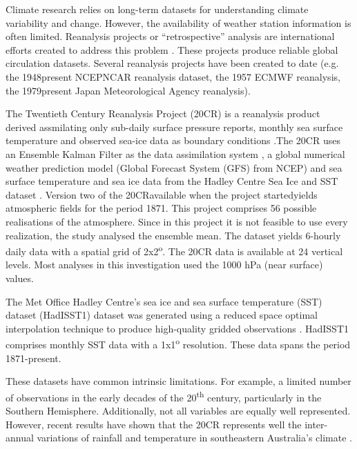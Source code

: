 Climate research relies on long-term datasets for understanding climate
variability and change. However, the availability of weather station 
information is often limited. Reanalysis projects
or \textquotedblleft retrospective\textquotedblright{} analysis are
international efforts created to address this problem \citep*{Compo2011}.
These projects produce reliable global circulation datasets. Several
reanalysis projects have been created to date (e.g. the 1948\textendash present
NCEP\textendash NCAR reanalysis dataset, the 1957
ECMWF reanalysis, the 1979\textendash present Japan Meteorological
Agency reanalysis). 

The Twentieth Century Reanalysis Project (20CR) is a reanalysis product
derived assmilating only sub-daily surface pressure reports,
monthly sea surface temperature and observed sea-ice data as boundary
conditions \citep*{Compo2011}.The 20CR uses an Ensemble Kalman Filter as 
the data assimilation system \citep{Whitaker2011}, a global numerical weather prediction model 
(Global Forecast System (GFS) from NCEP) and sea surface temperature and sea ice data from
the Hadley Centre Sea Ice and SST dataset \citep{Rayner2003}. Version two of the 20CR\textemdash available
when the project started\textemdash yields atmospheric fields for
the period 1871. This project comprises 56 possible
realisations of the atmosphere. Since in this project it is not feasible
to use every realization, the study analysed the ensemble mean. The
dataset yields 6-hourly daily data with a spatial grid of 2x2\textsuperscript{o}.
The 20CR data is available at 24 vertical levels. Most analyses in
this investigation used the 1000 hPa (near surface) values.

The Met Office Hadley Centre\textquoteright s sea ice and sea surface
temperature (SST) dataset (HadISST1) dataset was generated using a
reduced space optimal interpolation technique to produce high-quality
gridded observations \citep{Rayner2003}. HadISST1 comprises monthly
SST data with a 1x1\textsuperscript{o} resolution. These data spans
the period 1871-present.

These datasets have common intrinsic limitations. For example, a limited
number of observations in the early decades of the 20\textsuperscript{th}
century, particularly in the Southern Hemisphere.
Additionally, not all variables are equally well represented. However,
recent results have shown that the 20CR represents well the inter-annual variations 
of rainfall and temperature in southeastern Australia\textquoteright s climate \citep{Ashcroft2014}. 

